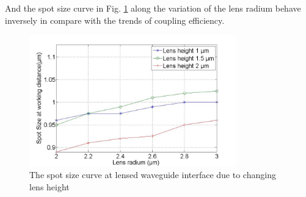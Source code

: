 And the spot size curve in Fig. \ref{fig:lensed_guide_spot_size_curve_rxx} along the variation of the lens radium behave inversely in compare with the trends of coupling efficiency.
\begin{figure}[!ht]
\centering
\includegraphics[width=0.8\textwidth]{bilder/spot_fix_lens_height_rxx}
\caption{The spot size curve at lensed waveguide interface due to changing lens height}
\label{fig:lensed_guide_spot_size_curve_rxx}
\end{figure}
